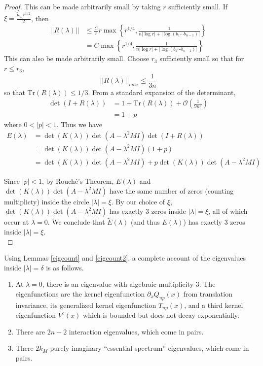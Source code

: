 \documentclass[thesis.tex]{subfiles}
\begin{document}
\begin{lemma}
\begin{proof}
This can be made arbitrarily small by taking $r$ sufficiently small. If $\xi = \frac{\tilde{\mu}_m r^{1/2}}{2}$, then 
\begin{align*}
||R(\lambda)|| &\leq \frac{C}{r} r \max\left\{ r^{1/4}, \frac{1}{n|\log r| + |\log(b_1 \cdots b_{n-1})|} \right\} \\
&= C \max\left\{ r^{1/4}, \frac{1}{n|\log r| + |\log(b_1 \cdots b_{n-1})|} \right\} 
\end{align*}
This can also be made arbitrarily small. Choose $r_3$ sufficiently small so that for $r \leq r_3$,
\[
||R(\lambda)||_{max} \leq \frac{1}{3n}
\] 
so that $\text{Tr}(R(\lambda)) \leq 1/3$. From a standard expansion of the determinant, 
\begin{align*}
\det(I + R(\lambda)) &= 1 + \text{Tr}(R(\lambda)) + \mathcal{O}\left(\frac{1}{9n^2} \right) \\
&= 1 + p
\end{align*}
where $0 < |p| < 1$. Thus we have
\begin{align*}
E(\lambda) &= \det(K(\lambda))\det(A - \lambda^2 MI)\det(I + R(\lambda)) \\
&= \det(K(\lambda))\det(A - \lambda^2 MI)(1 + p) \\
&= \det(K(\lambda))\det(A - \lambda^2 MI) + p \det(K(\lambda))\det(A - \lambda^2 MI)
\end{align*}

Since $|p| < 1$, by Rouch\'e's Theorem, $E(\lambda)$ and $\det(K(\lambda))\det(A - \lambda^2 MI)$ have the same number of zeros (counting multiplicty) inside the circle $|\lambda| = \xi$. By our choice of $\xi$, $\det(K(\lambda))\det(A - \lambda^2 MI)$ has exactly 3 zeros inside $|\lambda| = \xi$, all of which occur at $\lambda = 0$. We conclude that $\tilde{E}(\lambda)$ (and thus $E(\lambda)$) has exactly 3 zeros inside $|\lambda| = \xi$.\\
\end{proof}
\end{lemma}

Using Lemmas \ref{eigcount} and \ref{eigcount2}, a complete account of the eigenvalues inside $|\lambda| = \delta$ is as follows.
\begin{enumerate}
	\item At $\lambda = 0$, there is an eigenvalue with algebraic multiplicity 3. The eigenfunctions are the kernel eigenfunction $\partial_x Q_{np}(x)$ from translation invariance, its generalized kernel eigenfunction $T_{np}(x)$, and a third kernel eigenfunction $V^c(x)$ which is bounded but does not decay exponentially.
	\item There are $2n - 2$ interaction eigenvalues, which come in pairs.
	\item There $2 k_M$ purely imaginary ``essential spectrum'' eigenvalues, which come in pairs.
\end{enumerate}

% 
% 
\end{document}
